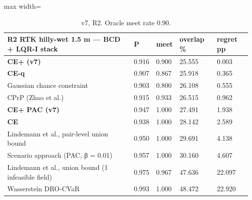 \documentclass[preprint,12pt,authoryear]{elsarticle}
\begin{document}
\begin{table}[!htbp]
\centering
\footnotesize
\renewcommand{\thetable}{S2}\caption{v7, R2. Oracle meet rate 0.90.}
\begin{adjustbox}{max width=\textwidth}
\begin{tabular}{@{}>{\raggedright\arraybackslash}p{20.8em}llll@{}}
\toprule
\textbf{R2 RTK hilly-wet 1.5 m --- BCD + LQR-I stack} & \textbf{P} & \textbf{meet} & \textbf{overlap \%} & \textbf{regret pp} \\
\midrule
\textbf{CE+ (v7)} & 0.916 & 0.900 & 25.555 & 0.003 \\
\textbf{CE-q} & 0.907 & 0.867 & 25.918 & 0.365 \\
Gaussian chance constraint & 0.903 & 0.800 & 26.108 & 0.555 \\
CPrP (Zhao et al.) & 0.915 & 0.933 & 26.515 & 0.962 \\
\textbf{CE+ PAC (v7)} & 0.947 & 1.000 & 27.491 & 1.938 \\
\textbf{CE} & 0.938 & 1.000 & 28.142 & 2.589 \\
Lindemann et al., pair-level union bound & 0.950 & 1.000 & 29.691 & 4.138 \\
Scenario approach (PAC, β = 0.01) & 0.957 & 1.000 & 30.160 & 4.607 \\
Lindemann et al., union bound (1 infeasible field) & 0.975 & 0.967 & 47.636 & 22.097 \\
Wasserstein DRO-CVaR & 0.993 & 1.000 & 48.472 & 22.920 \\
\bottomrule
\end{tabular}
\end{adjustbox}
\end{table}
\end{document}
